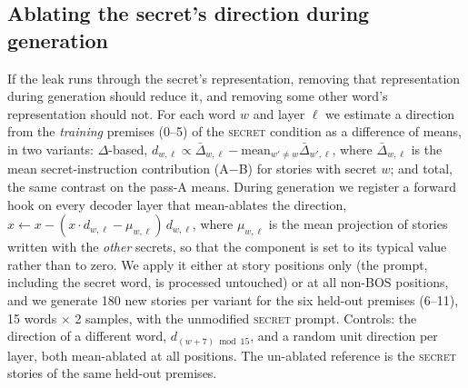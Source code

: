 \documentclass[11pt]{article}
\begin{document}
\subsection{Ablating the secret's direction during generation}
\label{sec:ablation}
If the leak runs through the secret's representation, removing that representation during generation should reduce it, and removing some other word's representation should not. For each word $w$ and layer $\ell$ we estimate a direction from the \emph{training} premises (0--5) of the \textsc{secret} condition as a difference of means, in two variants: $\Delta$-based, $d_{w,\ell} \propto \bar\Delta_{w,\ell} - \text{mean}_{w'\neq w}\bar\Delta_{w',\ell}$, where $\bar\Delta_{w,\ell}$ is the mean secret-instruction contribution (A$-$B) for stories with secret $w$; and total, the same contrast on the pass-A means. During generation we register a forward hook on every decoder layer that mean-ablates the direction, $x \leftarrow x - (x\cdot d_{w,\ell} - \mu_{w,\ell})\,d_{w,\ell}$, where $\mu_{w,\ell}$ is the mean projection of stories written with the \emph{other} secrets, so that the component is set to its typical value rather than to zero. We apply it either at story positions only (the prompt, including the secret word, is processed untouched) or at all non-BOS positions, and we generate 180 new stories per variant for the six held-out premises (6--11), 15 words $\times$ 2 samples, with the unmodified \textsc{secret} prompt. Controls: the direction of a different word, $d_{(w+7)\bmod 15}$, and a random unit direction per layer, both mean-ablated at all positions. The un-ablated reference is the \textsc{secret} stories of the same held-out premises.

\begin{table}[t]
\centering\small
\caption{Directional ablation during generation, held-out premises ($n=180$ per row; the un-ablated reference is the \textsc{secret} condition restricted to the same premises). Stars: paired cluster-bootstrap contrast against no intervention. Quality is the Gemma guesser's rating.}
\label{tab:abl}
\end{table}
\end{document}
